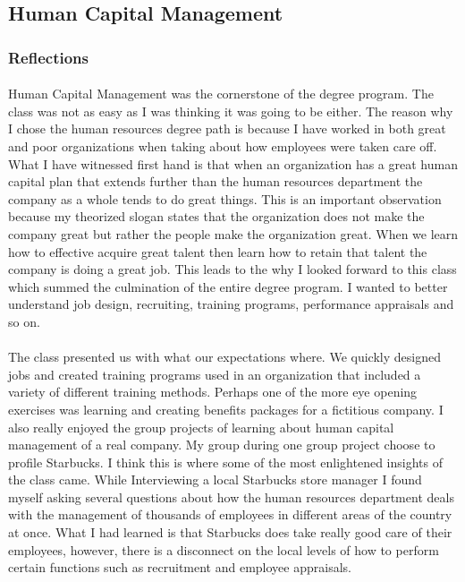 \documentclass[12pt,titlepage]{article}
\begin{document}
\subsection{Human Capital Management}
\subsubsection{Reflections}
\paragraph {}
Human Capital Management was the cornerstone of the degree program. The class was not as easy as I was thinking it was going to be either. The reason why I chose the human resources degree path is because I have worked in both great and poor organizations when taking about how employees were taken care off. What I have witnessed first hand is that when an organization has a great human capital plan that extends further than the human resources department the company as a whole tends to do great things. This is an important observation because my theorized slogan states that the organization does not make the company great but rather the people make the organization great. When we learn how to effective acquire great talent then learn how to retain that talent the company is doing a great job. This leads to the why I looked forward to this class which summed the culmination of the entire degree program. I wanted to better understand job design, recruiting, training programs, performance appraisals and so on.
\paragraph {}
The class presented us with what our expectations where. We quickly designed jobs and created training programs used in an organization that included a variety of different training methods. Perhaps one of the more eye opening exercises was learning and creating benefits packages for a fictitious company. I also really enjoyed the group projects of learning about human capital management of a real company. My group during one group project choose to profile Starbucks. I think this is where some of the most enlightened insights of the class came. While Interviewing a local Starbucks store manager I found myself asking several questions about how the human resources department deals with the management of thousands of employees in different areas of the country at once. What I had learned is that Starbucks does take really good care of their employees, however, there is a disconnect on the local levels of how to perform certain functions such as recruitment and employee appraisals.
\end{document}
